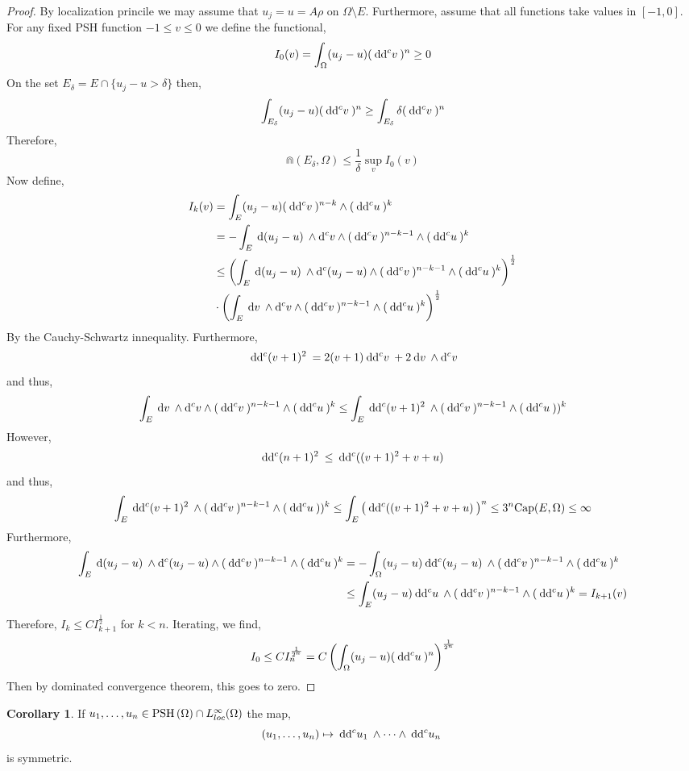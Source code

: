 \documentclass[12pt]{extarticle}
\renewcommand{\d}[1]{\: \mathrm{d}#1 \:}
\theoremstyle{definition}
\newtheorem{corollary}[theorem]{Corollary}
\begin{document}
\newcommand{\ddc}[1]{\d{\dc{#1}}}

\begin{proof}
By localization princile we may assume that $u_j = u = A \rho$ on $\Omega \setminus E$. Furthermore, assume that all functions take values in $[-1,0]$. For any fixed PSH function $-1 \le v \le 0$ we define the functional,
\[ I_0(v) = \int_\Omega (u_j - u) (\ddc{v})^n \ge 0 \]
On the set $E_\delta = E \cap \{ u_j - u > \delta \}$ then,
\[ \int_{E_\delta} (u_j - u) (\ddc{v})^n \ge \int_{E_\delta} \delta (\ddc{v})^n \]
Therefore,
\[ \Cap(E_\delta, \Omega) \le \frac{1}{\delta} \sup_v I_0(v) \]
Now define,
\begin{align*}
I_k(v)  & = \int_{E} (u_j - u) (\ddc{v})^{n - k} \wedge (\ddc{u})^k
\\
& = - \int_E \d{(u_j - u)} \wedge \dc{v} \wedge (\ddc{v})^{n - k - 1} \wedge (\ddc{u})^{k}
\\
& \le \left( \int_E \d{(u_j - u)} \wedge \dc{(u_j - u)} \wedge (\ddc{v})^{n - k - 1} \wedge (\ddc{u})^{k} \right)^{\frac{1}{2}}
\\
& \cdot \left( \int_E \d{v} \wedge \dc{v} \wedge (\ddc{v})^{n - k - 1} \wedge (\ddc{u})^{k} \right)^{\frac{1}{2}}
\end{align*}
By the Cauchy-Schwartz innequality. Furthermore,
\[ \ddc{(v + 1)^2} = 2 (v + 1) \ddc{v} + 2 \d{v} \wedge \dc{v} \]
and thus,
\[ \int_E \d{v} \wedge \dc{v} \wedge (\ddc{v})^{n - k - 1} \wedge (\ddc{u})^{k} \le \int_E \ddc{(v + 1)^2} \wedge (\ddc{v})^{n - k - 1} \wedge (\ddc{u}))^k \]
However,
\[ \ddc{(n+1)^2} \le \ddc{( ( v + 1)^2 + v + u )} \]
and thus,
\[ \int_E \ddc{(v + 1)^2} \wedge (\ddc{v})^{n - k - 1} \wedge (\ddc{u}))^k \le \int_E \left( \ddc{((v + 1)^2 + v + u)} \right)^n \le 3^n \Cap(E, \Omega) \le \infty \]
Furthermore, 
\begin{align*}
\int_E \d{(u_j - u)} \wedge \dc{(u_j - u)} \wedge (\ddc{v})^{n - k - 1} \wedge (\ddc{u})^{k} & = - \int_\Omega (u_j - u) \ddc{(u_j - u)} \wedge (\ddc{v})^{n - k - 1} \wedge (\ddc{u})^{k}
\\
& \le \int_E (u_j - u) \ddc{u} \wedge (\ddc{v})^{n - k - 1} \wedge (\ddc{u})^k = I_{k+1}(v) 
\end{align*}
Therefore, $I_k \le C I_{k+1}^{\frac{1}{2}}$ for $k < n$. Iterating, we find,
\[ I_0 \le C I_n^{\frac{1}{2^n}} = C \left( \int_\Omega (u_j - u) (\ddc{u})^n \right)^{\frac{1}{2^n}} \]
Then by dominated convergence theorem, this goes to zero. 
\end{proof}

\begin{corollary}
If $u_1, \dots, u_n \in \mathrm{PSH}\left( \Omega \right) \cap L^\infty_{loc}(\Omega)$ the map,
\[ (u_1, \dots, u_n) \mapsto \ddc{u_1} \wedge \cdots \wedge \ddc{u_n} \]
is symmetric.
\end{corollary}
\end{document}
